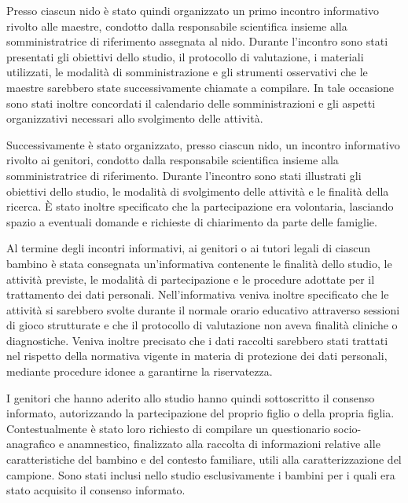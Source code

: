 Presso ciascun nido è stato quindi organizzato un primo incontro informativo rivolto alle maestre, condotto dalla responsabile scientifica insieme alla somministratrice di riferimento assegnata al nido. Durante l'incontro sono stati presentati gli obiettivi dello studio, il protocollo di valutazione, i materiali utilizzati, le modalità di somministrazione e gli strumenti osservativi che le maestre sarebbero state successivamente chiamate a compilare. In tale occasione sono stati inoltre concordati il calendario delle somministrazioni e gli aspetti organizzativi necessari allo svolgimento delle attività.

Successivamente è stato organizzato, presso ciascun nido, un incontro informativo rivolto ai genitori, condotto dalla responsabile scientifica insieme alla somministratrice di riferimento. Durante l'incontro sono stati illustrati gli obiettivi dello studio, le modalità di svolgimento delle attività e le finalità della ricerca. È stato inoltre specificato che la partecipazione era volontaria, lasciando spazio a eventuali domande e richieste di chiarimento da parte delle famiglie.

Al termine degli incontri informativi, ai genitori o ai tutori legali di ciascun bambino è stata consegnata un'informativa contenente le finalità dello studio, le attività previste, le modalità di partecipazione e le procedure adottate per il trattamento dei dati personali. Nell'informativa veniva inoltre specificato che le attività si sarebbero svolte durante il normale orario educativo attraverso sessioni di gioco strutturate e che il protocollo di valutazione non aveva finalità cliniche o diagnostiche. Veniva inoltre precisato che i dati raccolti sarebbero stati trattati nel rispetto della normativa vigente in materia di protezione dei dati personali, mediante procedure idonee a garantirne la riservatezza.

I genitori che hanno aderito allo studio hanno quindi sottoscritto il consenso informato, autorizzando la partecipazione del proprio figlio o della propria figlia. Contestualmente è stato loro richiesto di compilare un questionario socio-anagrafico e anamnestico, finalizzato alla raccolta di informazioni relative alle caratteristiche del bambino e del contesto familiare, utili alla caratterizzazione del campione. Sono stati inclusi nello studio esclusivamente i bambini per i quali era stato acquisito il consenso informato.


